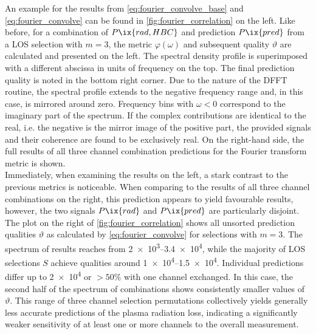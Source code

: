             An example for the results from \cref{eq:fourier_convolve_base} and \cref{eq:fourier_convolve} can be found in \cref{fig:fourier_correlation} on the left. Like before, for a combination of $P\ix{rad,HBC}$ and prediction $P\ix{pred}$ from a LOS  selection with $m=3$, the metric $\varphi\left(\omega\right)$ and subsequent quality $\vartheta$ are calculated and presented on the left. The spectral density profile is superimposed with a different abscissa in units of frequency on the top. The final prediction quality is noted in the bottom right corner. Due to the nature of the DFFT routine, the spectral profile extends to the negative frequency range and, in this case, is mirrored around zero. Frequency bins with $\omega<0$ correspond to the imaginary part of the spectrum. If the complex contributions are identical to the real, i.e. the negative is the mirror image of the positive part, the provided signals and their coherence are found to be exclusively real\cite{Cooley1965}. On the right-hand side, the full results of all three channel combination predictions for the Fourier transform metric is shown.\\%
            Immediately, when examining the results on the left, a stark contrast to the previous metrics is noticeable. When comparing to the results of all three channel combinations on the right, this prediction appears to yield favourable results, however, the two signals $P\ix{rad}$ and $P\ix{pred}$ are particularly disjoint. The plot on the right of \cref{fig:fourier_correlation} shows all unsorted prediction qualities $\vartheta$ as calculated by \cref{eq:fourier_convolve} for selections with $m=3$. The spectrum of results reaches from \SIrange{2e3}{3.4e4}{\arbitraryunit}, while the majority of LOS selections $S$ achieve qualities around \SIrange{1e4}{1.5e4}{\arbitraryunit}. Individual predictions differ up to \SI{2e4}{\arbitraryunit} or $>50\%$ with one channel exchanged. In this case, the second half of the spectrum of combinations shows consistently smaller values of $\vartheta$. This range of three channel selection permutations collectively yields generally less accurate predictions of the plasma radiation loss, indicating a significantly weaker sensitivity of at least one or more channels to the overall measurement.\\%
%
